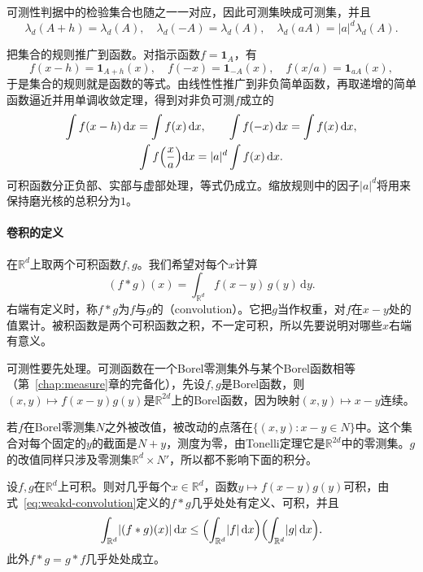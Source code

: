 可测性判据中的检验集合也随之一一对应，因此可测集映成可测集，并且
\[
\lambda_d(A+h)=\lambda_d(A),\quad\lambda_d(-A)=\lambda_d(A),\quad\lambda_d(aA)=\lvert a\rvert^d\lambda_d(A).
\]

把集合的规则推广到函数。对指示函数$f=\mathbf 1_A$，有
\[
f(x-h)=\mathbf 1_{A+h}(x),\quad f(-x)=\mathbf 1_{-A}(x),\quad f(x/a)=\mathbf 1_{aA}(x),
\]
于是集合的规则就是函数的等式。由线性性推广到非负简单函数，再取递增的简单函数逼近并用单调收敛定理，得到对非负可测$f$成立的
\begin{equation}
\begin{gathered}
\int f(x-h)\,\mathrm dx=\int f(x)\,\mathrm dx,\qquad
\int f(-x)\,\mathrm dx=\int f(x)\,\mathrm dx,\\
\int f\Bigl(\frac xa\Bigr)\mathrm dx=\lvert a\rvert^d\int f(x)\,\mathrm dx .
\end{gathered}
\label{eq:weakd-translation-scaling}
\end{equation}
可积函数分正负部、实部与虚部处理，等式仍成立。缩放规则中的因子$\lvert a\rvert^d$将用来保持磨光核的总积分为$1$。

\paragraph{卷积的定义}
在$\mathbb R^d$上取两个可积函数$f,g$。我们希望对每个$x$计算
\begin{equation}
(f*g)(x)=\int_{\mathbb R^d}f(x-y)\,g(y)\,\mathrm dy .
\label{eq:weakd-convolution}
\end{equation}
右端有定义时，称$f*g$为$f$与$g$的（convolution）。它把$g$当作权重，对$f$在$x-y$处的值累计。被积函数是两个可积函数之积，不一定可积，所以先要说明对哪些$x$右端有意义。

可测性要先处理。可测函数在一个Borel零测集外与某个Borel函数相等（第~\ref{chap:measure}章的完备化），先设$f,g$是Borel函数，则$(x,y)\mapsto f(x-y)g(y)$是$\mathbb R^{2d}$上的Borel函数，因为映射$(x,y)\mapsto x-y$连续。

若$f$在Borel零测集$N$之外被改值，被改动的点落在$\{(x,y):x-y\in N\}$中。这个集合对每个固定的$y$的截面是$N+y$，测度为零，由Tonelli定理它是$\mathbb R^{2d}$中的零测集。$g$的改值同样只涉及零测集$\mathbb R^d\times N'$，所以都不影响下面的积分。

\begin{theorem}[可积函数的卷积]
\label{thm:weakd-convolution-l1}
设$f,g$在$\mathbb R^d$上可积。则对几乎每个$x\in\mathbb R^d$，函数$y\mapsto f(x-y)g(y)$可积，由式~\eqref{eq:weakd-convolution}定义的$f*g$几乎处处有定义、可积，并且
\begin{equation}
\int_{\mathbb R^d}\lvert(f*g)(x)\rvert\,\mathrm dx\leq\Bigl(\int_{\mathbb R^d}\lvert f\rvert\,\mathrm dx\Bigr)\Bigl(\int_{\mathbb R^d}\lvert g\rvert\,\mathrm dx\Bigr).
\label{eq:weakd-young-l1}
\end{equation}
此外$f*g=g*f$几乎处处成立。
\end{theorem}

